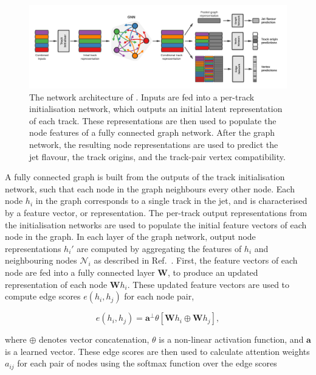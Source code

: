 \begin{figure}[!htbp]
    \centering
    \includegraphics[width=\textwidth]{chapters/gnn_tagger/figs/full_arch.pdf}
    \caption{The network architecture of \GNN. Inputs are fed into a per-track initialisation network, which outputs an initial latent representation of each track. These representations are then used to populate the node features of a fully connected graph network. After the graph network, the resulting node representations are used to predict the jet flavour, the track origins, and the track-pair vertex compatibility.}
    \label{fig:new_arch}
\end{figure}


A fully connected graph is built from the outputs of the track initialisation network, such that each node in the graph neighbours every other node.
Each node $h_i$ in the graph corresponds to a single track in the jet, and is characterised by a feature vector, or representation.
The per-track output representations from the initialisation networks are used to populate the initial feature vectors of each node in the graph.
In each layer of the graph network, output node representations $h_i'$ are computed by aggregating the features of $h_i$ and neighbouring nodes $\mathcal{N}_i$ as described in Ref.~\cite{2021arXiv210514491B}.
First, the feature vectors of each node are fed into a fully connected layer $\mathbf{W}$, to produce an updated representation of each node $\mathbf{W} h_i$.
These updated feature vectors are used to compute edge scores $e(h_i, h_j)$ for each node pair,

\begin{equation}\label{eq:edge_score}
    e(h_i, h_j) = \mathbf{a}^\perp \theta \left[ \mathbf{W}h_i \oplus \mathbf{W}h_j \right],
\end{equation}

where $\oplus$ denotes vector concatenation, $\theta$ is a non-linear activation function, and $\mathbf{a}$ is a learned vector.
These edge scores are then used to calculate attention weights $a_{ij}$ for each pair of nodes using the softmax function over the edge scores


